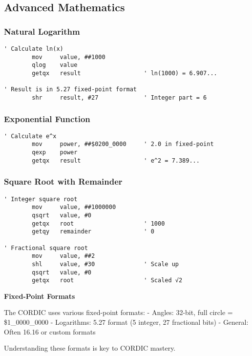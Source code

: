 \documentclass[11pt]{book}
\begin{document}
\hypertarget{advanced-mathematics}{%
\subsection{Advanced Mathematics}\label{advanced-mathematics}}

\hypertarget{natural-logarithm}{%
\subsubsection{Natural Logarithm}\label{natural-logarithm}}

\begin{lstlisting}
' Calculate ln(x)
        mov     value, ##1000
        qlog    value
        getqx   result                  ' ln(1000) = 6.907...
        
' Result is in 5.27 fixed-point format
        shr     result, #27             ' Integer part = 6
\end{lstlisting}

\hypertarget{exponential-function}{%
\subsubsection{Exponential Function}\label{exponential-function}}

\begin{lstlisting}
' Calculate e^x
        mov     power, ##$0200_0000     ' 2.0 in fixed-point
        qexp    power
        getqx   result                  ' e^2 = 7.389...
\end{lstlisting}

\hypertarget{square-root-with-remainder}{%
\subsubsection{Square Root with
Remainder}\label{square-root-with-remainder}}

\begin{lstlisting}
' Integer square root
        mov     value, ##1000000
        qsqrt   value, #0
        getqx   root                    ' 1000
        getqy   remainder               ' 0
        
' Fractional square root
        mov     value, ##2
        shl     value, #30              ' Scale up
        qsqrt   value, #0
        getqx   root                    ' Scaled √2
\end{lstlisting}

\begin{interlude}
\textbf{Fixed-Point Formats}

The CORDIC uses various fixed-point formats:
- Angles: 32-bit, full circle = \$1\_0000\_0000
- Logarithms: 5.27 format (5 integer, 27 fractional bits)
- General: Often 16.16 or custom formats

Understanding these formats is key to CORDIC mastery.
\end{interlude}
\end{document}
